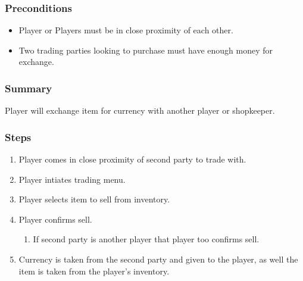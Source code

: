 \documentclass[12pt]{report}
\begin{document}
    \subsubsection{Preconditions}
    \begin{itemize}
        \item Player or Players must be in close proximity of each other.
        \item Two trading parties looking to purchase must have enough money for exchange.
    \end{itemize}

    \subsubsection{Summary}
    Player will exchange item for currency with another player or shopkeeper.

    \subsubsection{Steps}
    \begin{enumerate}
        \item Player comes in close proximity of second party to trade with.
        \item Player intiates trading menu.
        \item Player selects item to sell from inventory.
        \item Player confirms sell.
            \begin{enumerate}
                \item If second party is another player that player too confirms sell.
            \end{enumerate}
        \item Currency is taken from the second party and given to the player, as well the item is taken from the player's inventory.
    \end{enumerate}
\end{document}
